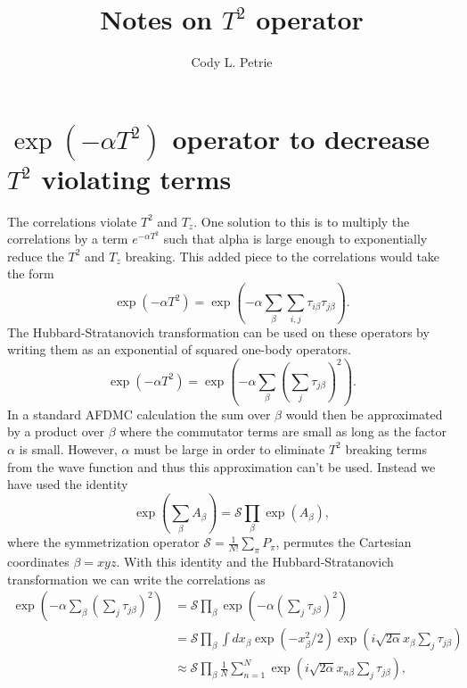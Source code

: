 \documentclass[12pt]{article}
\title{Notes on $T^2$ operator}
\author{Cody L. Petrie}
\begin{document}
\maketitle

\section{$\exp(-\alpha T^2)$ operator to decrease $T^2$ violating terms}
The correlations violate $T^2$ and $T_z$. One solution to this is to multiply the correlations by a term $e^{-\alpha T^2}$ such that alpha is large enough to exponentially reduce the $T^2$ and $T_z$ breaking. This added piece to the correlations would take the form
\begin{equation}
   \exp{\left(-\alpha T^2\right)} = \exp{\left(-\alpha \sum\limits_\beta \sum\limits_{i,j} \tau_{i\beta}\tau_{j\beta}\right)}.
\end{equation}
The Hubbard-Stratanovich transformation can be used on these operators by writing them as an exponential of squared one-body operators.
\begin{equation}
   \exp{\left(-\alpha T^2\right)} = \exp{\left(-\alpha \sum\limits_\beta \left(\sum\limits_{j} \tau_{j\beta}\right)^2\right)}.
\end{equation}
In a standard AFDMC calculation the sum over $\beta$ would then be approximated by a product over $\beta$ where the commutator terms are small as long as the factor $\alpha$ is small. However, $\alpha$ must be large in order to eliminate $T^2$ breaking terms from the wave function and thus this approximation can't be used. Instead we have used the identity
\begin{equation}
   \exp{\left(\sum\limits_\beta A_\beta\right)} = \mathcal{S}\prod\limits_\beta \exp(A_\beta),
\end{equation}
where the symmetrization operator $\mathcal{S}=\frac{1}{N!}\sum\limits_\pi P_\pi$, permutes the Cartesian coordinates $\beta=xyz$. With this identity and the Hubbard-Stratanovich transformation we can write the correlations as
\begin{align}
   \exp{\left(-\alpha \sum\limits_\beta \left(\sum\limits_{j} \tau_{j\beta}\right)^2\right)}  &= \mathcal{S} \prod\limits_\beta \exp{\left(-\alpha \left(\sum\limits_{j} \tau_{j\beta}\right)^2\right)} \\
   &= \mathcal{S} \prod\limits_\beta \int dx_\beta \exp{\left(-x_\beta^2/2\right)}\exp{\left(i\sqrt{2\alpha}x_\beta \sum\limits_{j} \tau_{j\beta}\right)} \\
   &\approx \mathcal{S} \prod\limits_\beta \frac{1}{N}\sum\limits_{n=1}^N \exp{\left(i\sqrt{2\alpha}x_{n\beta} \sum\limits_{j} \tau_{j\beta}\right)},
\end{align}
\end{document}
